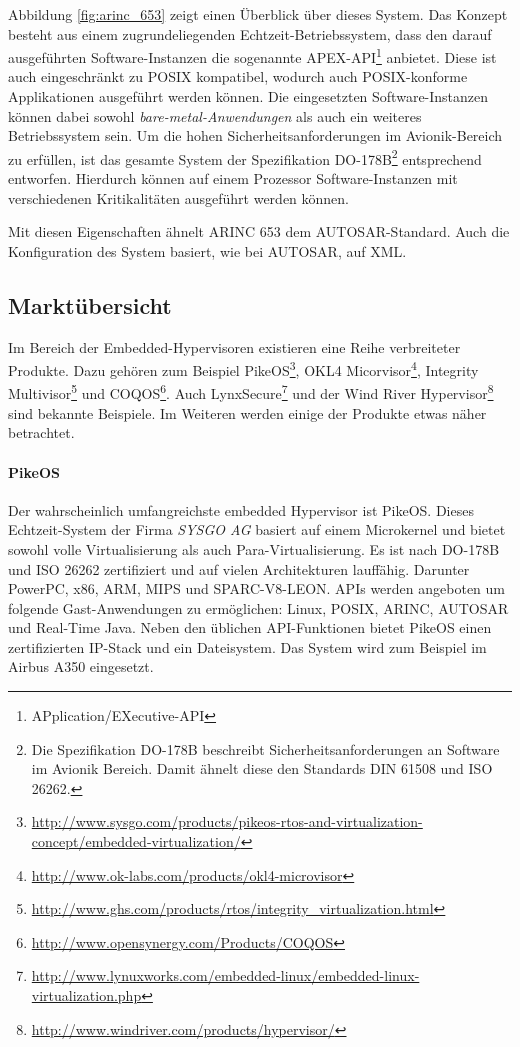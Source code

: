\documentclass[
  a4paper,					    %
  twoside,
  DIV=calc,     				%
  bibliography=totoc,
  cleardoublepage=empty,
  ngerman,     					%
  final       					%
]{scrbook}
\begin{document}
Abbildung \ref{fig:arinc_653} zeigt einen Überblick über dieses System. Das Konzept besteht aus einem zugrundeliegenden Echtzeit-Betriebssystem, dass den darauf ausgeführten Software-Instanzen die sogenannte APEX-API\footnote{APplication/EXecutive-API} anbietet. Diese ist auch eingeschränkt zu POSIX kompatibel\cite{wiki:arinc_653}, wodurch auch POSIX-konforme Applikationen ausgeführt werden können. Die eingesetzten Software-Instanzen können dabei sowohl \emph{bare-metal-Anwendungen} als auch ein weiteres Betriebssystem sein. Um die hohen Sicherheitsanforderungen im Avionik-Bereich zu erfüllen, ist das gesamte System der Spezifikation DO-178B\footnote{Die Spezifikation DO-178B beschreibt Sicherheitsanforderungen an Software im Avionik Bereich. Damit ähnelt diese den Standards DIN 61508 und ISO 26262.} entsprechend entworfen. Hierdurch können auf einem Prozessor Software-Instanzen mit verschiedenen Kritikalitäten ausgeführt werden können. 

Mit diesen Eigenschaften ähnelt ARINC 653 dem AUTOSAR-Standard. Auch die Konfiguration des System basiert, wie bei AUTOSAR, auf XML.


\subsection{Marktübersicht}
Im Bereich der Embedded-Hypervisoren existieren eine Reihe verbreiteter Produkte. Dazu gehören zum Beispiel PikeOS\footnote{\url{http://www.sysgo.com/products/pikeos-rtos-and-virtualization-concept/embedded-virtualization/}}, OKL4 Micorvisor\footnote{\url{http://www.ok-labs.com/products/okl4-microvisor}}, Integrity Multivisor\footnote{\url{http://www.ghs.com/products/rtos/integrity_virtualization.html}} und COQOS\footnote{\url{http://www.opensynergy.com/Products/COQOS}}. Auch LynxSecure\footnote{\url{http://www.lynuxworks.com/embedded-linux/embedded-linux-virtualization.php}} und der Wind River Hypervisor\footnote{\url{http://www.windriver.com/products/hypervisor/}} sind bekannte Beispiele. Im Weiteren werden einige der Produkte etwas näher betrachtet.

\paragraph{PikeOS}
Der wahrscheinlich umfangreichste embedded Hypervisor ist PikeOS. Dieses Echtzeit-System der Firma \emph{SYSGO AG} basiert auf einem Microkernel und bietet sowohl volle Virtualisierung als auch Para-Virtualisierung. Es ist nach DO-178B und ISO 26262 zertifiziert und auf vielen Architekturen lauffähig. Darunter PowerPC, x86, ARM, MIPS und SPARC-V8-LEON. APIs werden angeboten um folgende Gast-Anwendungen zu ermöglichen: Linux, POSIX, ARINC, AUTOSAR und Real-Time Java. Neben den üblichen API-Funktionen bietet PikeOS einen zertifizierten IP-Stack und ein Dateisystem. Das System wird zum Beispiel im Airbus A350 eingesetzt.
\end{document}

